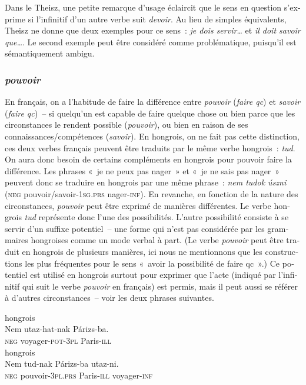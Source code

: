 \documentclass[output=paper,colorlinks,citecolor=brown,arabicfont,chinesefont,booklanguage=french]{langscibook}
\begin{document}
\begin{otherlanguage}{french}
Dans le Theisz, une petite remarque d’usage éclaircit que le sens en question s’exprime si l’infinitif d’un autre verbe suit \emph{devoir}. Au lieu de simples équivalents, Theisz ne donne que deux exemples pour ce sens~: \emph{je dois servir…} et \emph{il doit savoir que…}. Le second exemple peut être considéré comme problématique, puisqu’il est sémantiquement ambigu.  

\subsubsection{\textit{pouvoir}}

En français, on a l’habitude de faire la différence entre \emph{pouvoir} (\emph{faire qc}) et \emph{savoir} (\emph{faire qc})~-- si quelqu’un est capable de faire quelque chose ou bien parce que les circonstances le rendent possible (\emph{pouvoir}), ou bien en raison de ses connaissances/compétences (\emph{savoir}). En hongrois, on ne fait pas cette distinction, ces deux verbes français peuvent être traduits par le même verbe hongrois~: \emph{tud}. On aura donc besoin de certains compléments en hongrois pour pouvoir faire la différence. Les phrases «~je ne peux pas nager~» et «~je ne sais pas nager~» peuvent donc se traduire en hongrois par une même phrase~: \emph{nem tudok úszni} (\textsc{neg} pouvoir/savoir-\textsc{1sg.prs} nager-\textsc{inf}). En revanche, en fonction de la nature des circonstances, \emph{pouvoir} peut être exprimé de manières différentes. Le verbe hongrois \emph{tud} représente donc l’une des possibilités. L’autre possibilité consiste à se servir d’un suffixe potentiel~-- une forme qui n’est pas considérée par les grammaires hongroises comme un mode verbal à part. (Le verbe \emph{pouvoir} peut être traduit en hongrois de plusieurs manières, ici nous ne mentionnons que les constructions les plus fréquentes pour le sens «~avoir la possibilité de faire qc~».) Ce potentiel est utilisé en hongrois surtout pour exprimer que l’acte (indiqué par l’infinitif qui suit le verbe \emph{pouvoir} en français) est permis, mais il peut aussi se référer à d’autres circonstances~-- voir les deux phrases suivantes.

\ea hongrois\\
\gll Nem utaz-hat-nak Párizs-ba.\\ 
     \textsc{neg} voyager-\textsc{pot-3pl} Paris-\textsc{ill}\\
\glt {}
\ex hongrois\\
\gll Nem tud-nak Párizs-ba utaz-ni.\\
     \textsc{neg} pouvoir-\textsc{3pl.prs} Paris-\textsc{ill} voyager-\textsc{inf}\\
\glt {}
\z


\end{otherlanguage}
\end{document}
